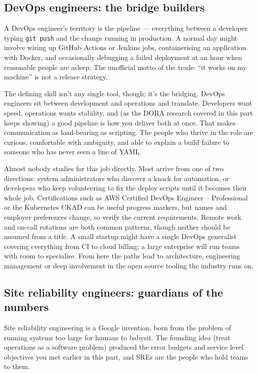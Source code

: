 \subsection{DevOps engineers: the bridge builders}


A DevOps engineer's territory is the pipeline — everything between a developer typing \texttt{git push} and the change running in production. A normal day might involve wiring up GitHub Actions or Jenkins jobs, containerising an application with Docker, and occasionally debugging a failed deployment at an hour when reasonable people are asleep. The unofficial motto of the trade: ``it works on my machine'' is not a release strategy.


The defining skill isn't any single tool, though; it's the bridging. DevOps engineers sit between development and operations and translate. Developers want speed, operations wants stability, and (as the DORA research covered in this part keeps showing) a good pipeline is how you deliver both at once. That makes communication as load-bearing as scripting. The people who thrive in the role are curious, comfortable with ambiguity, and able to explain a build failure to someone who has never seen a line of YAML.


Almost nobody studies for this job directly. Most arrive from one of two directions: system administrators who discover a knack for automation, or developers who keep volunteering to fix the deploy scripts until it becomes their whole job. Certifications such as AWS Certified DevOps Engineer – Professional or the Kubernetes CKAD can be useful progress markers, but names and employer preferences change, so verify the current requirements. Remote work and on-call rotations are both common patterns, though neither should be assumed from a title. A small startup might have a single DevOps generalist covering everything from CI to cloud billing; a large enterprise will run teams with room to specialise. From here the paths lead to architecture, engineering management or deep involvement in the open source tooling the industry runs on.



\subsection{Site reliability engineers: guardians of the numbers}


Site reliability engineering is a Google invention, born from the problem of running systems too large for humans to babysit. The founding idea (treat operations as a software problem) produced the error budgets and service level objectives you met earlier in this part, and SREs are the people who hold teams to them.


